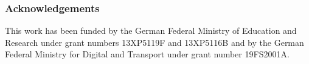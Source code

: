 \documentclass[runningheads]{llncs}
\begin{document}
%
%
\subsubsection*{Acknowledgements}

This work has been funded by the German Federal Ministry of Education and Research under grant numbers 13XP5119F and 13XP5116B and by the German Federal Ministry for Digital and Transport under grant number 19FS2001A.
\end{document}
